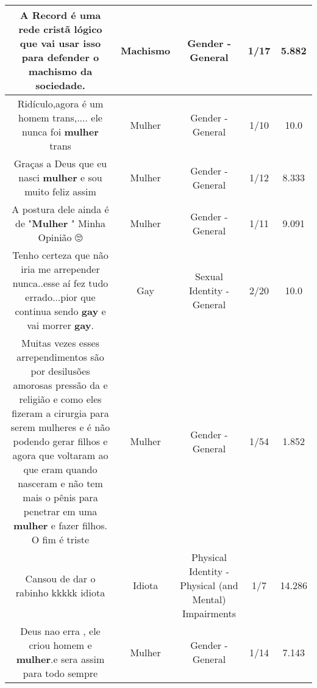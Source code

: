 \documentclass[11pt]{article}
\newlength\mylength
\begin{document}
\begin{center}
\begin{longtable}{|C{.65\mylength}|C{.30\mylength}|C{.12\mylength}|C{.12\mylength}|C{.12\mylength}|}
  \small A Record é uma rede cristã lógico que vai usar isso para defender o \textbf{machismo} da sociedade.\normalsize   & Machismo & Gender - General & 1/17 & 5.882 \\  \hline
  \small Ridículo,agora é um homem trans,.... ele nunca foi \textbf{mulher} trans\normalsize   & Mulher & Gender - General & 1/10 & 10.0 \\  \hline
  \small Graças a Deus que eu nasci \textbf{mulher} e sou muito feliz assim\normalsize   & Mulher & Gender - General & 1/12 & 8.333 \\  \hline
  \small A postura dele ainda é de "\textbf{Mulher} " Minha Opinião 🙄\normalsize   & Mulher & Gender - General & 1/11 & 9.091 \\  \hline
  \small Tenho certeza que não iria me arrepender nunca..esse aí fez tudo errado...pior que continua sendo \textbf{gay} e vai morrer \textbf{gay}.\normalsize   & Gay & Sexual Identity - General & 2/20 & 10.0 \\  \hline
  \small Muitas vezes esses arrependimentos são por desilusões amorosas pressão da e religião e como eles fizeram a cirurgia para serem mulheres e é não podendo gerar filhos e agora que voltaram ao que eram quando nasceram e não tem mais o pênis para penetrar em uma \textbf{mulher} e fazer filhos. O fim é triste\normalsize   & Mulher & Gender - General & 1/54 & 1.852 \\  \hline
  \small Cansou de dar o rabinho kkkkk idiota\normalsize   & Idiota & Physical Identity - Physical (and Mental) Impairments & 1/7 & 14.286 \\  \hline
  \small Deus nao erra , ele criou homem e \textbf{mulher}.e sera assim para todo sempre\normalsize   & Mulher & Gender - General & 1/14 & 7.143 \\  \hline

\end{longtable}
\end{center}
\end{document}
